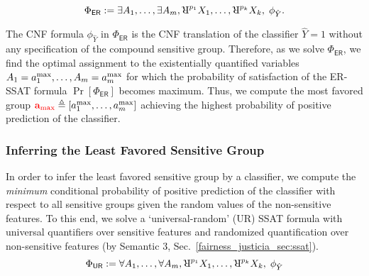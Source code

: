 \begin{equation}
\Phi_{\mathsf{ER}} := \exists A_1,\dots, \exists A_{\numsensitive},
 \R^{p_{1}}X_1, \dots, \R^{p_{\numnonsensitive}}X_{\numnonsensitive},   \; \phi_{\hat{Y}}.
 \label{fairness_justicia_eq:er}
\end{equation}

The CNF formula $\phi_{\hat{Y}}$ in $ \Phi_{\mathsf{ER}} $ is the CNF translation  of the classifier $ \hat{Y} = 1 $ without any specification of the compound sensitive group.  Therefore, as we solve $ \Phi_{\mathsf{ER}} $, we find the optimal assignment to the existentially quantified variables $ A_1 = a^{\max}_1, \dots,A_{m} = a^{\max}_{m} $ for which the probability of satisfaction of the ER-SSAT formula $ \Pr[\Phi_{\mathsf{ER}}] $ becomes maximum. Thus, we compute  the most favored group $ \textcolor{red}{\mathbf{a}_{\max}} \triangleq [ a^{\max}_1, \dots, a^{\max}_{m} ] $ achieving the highest probability of positive prediction of the classifier. 


\subsubsection{Inferring the Least Favored Sensitive Group}
In order to infer the least favored sensitive group by a classifier, we  compute the \textit{minimum} conditional probability of positive prediction of the classifier with respect to all sensitive groups given the random values of the non-sensitive features. To this end, we  solve a `universal-random' (UR) SSAT formula with  universal quantifiers over sensitive features and randomized quantification over non-sensitive features (by Semantic 3, Sec.~\ref{fairness_justicia_sec:ssat}).
\begin{equation}
\Phi_{\mathsf{UR}} := \forall A_1,\dots, \forall A_{\numsensitive},
\R^{p_{1}}X_1, \dots, \R^{p_{\numnonsensitive}}X_{\numnonsensitive},   \; \phi_{\hat{Y}}
\label{fairness_justicia_eq:ar}
\end{equation}

